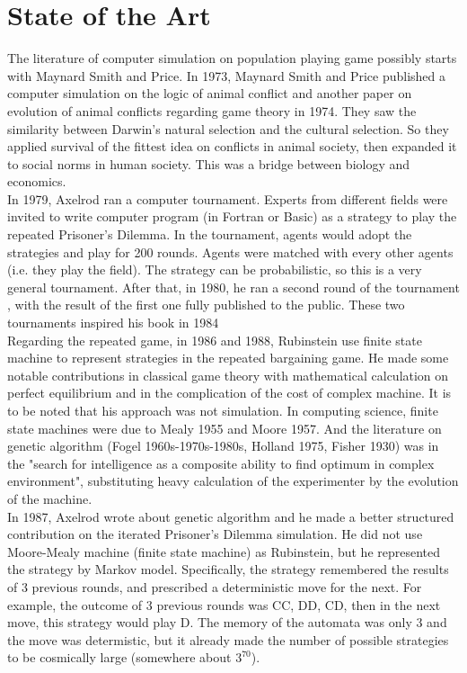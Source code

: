 \documentclass[12.5pt]{report}
\begin{document}
\chapter{State of the Art}

The literature of computer simulation on population playing game possibly starts with Maynard Smith and Price. In 1973, Maynard Smith and Price published a computer simulation on the logic of animal conflict \cite{maynard2} and another paper on evolution of animal conflicts regarding game theory in 1974. They saw the similarity between Darwin's natural selection and the cultural selection. So they applied survival of the fittest idea on conflicts in animal society, then expanded it to social norms in human society. This was a bridge between biology and economics.\\

In 1979, Axelrod \cite{axel1} ran a computer tournament. Experts from different fields were invited to write computer program (in Fortran or Basic) as a strategy to play the repeated Prisoner's Dilemma. In the tournament, agents would adopt the strategies and play for 200 rounds. Agents were matched with every other agents (i.e. they play the field). The strategy can be probabilistic, so this is a very general tournament. After that, in 1980, he ran a second round of the tournament \cite{axel2}, with the result of the first one fully published to the public. These two tournaments inspired his book in 1984 \cite{axel3}\\

Regarding the repeated game, in 1986 and 1988, Rubinstein use finite state machine to represent strategies in the repeated bargaining game. He made some notable contributions in classical game theory with mathematical calculation on perfect equilibrium and in the complication of the cost of complex machine. It is to be noted that his approach was not simulation. In computing science, finite state machines were due to Mealy 1955 and Moore 1957. And the literature on genetic algorithm (Fogel 1960s-1970s-1980s, Holland 1975, Fisher 1930) was in the "search for intelligence as a composite ability to find optimum in complex environment", substituting heavy calculation of the experimenter by the evolution of the machine.\\

In 1987, Axelrod wrote about genetic algorithm \cite{axel4} and he made a better structured contribution on the iterated Prisoner's Dilemma simulation. He did not use Moore-Mealy machine (finite state machine) as Rubinstein, but he represented the strategy by Markov model. Specifically, the strategy remembered the results of 3 previous rounds, and prescribed a deterministic move for the next. For example, the outcome of 3 previous rounds was CC, DD, CD, then in the next move, this strategy would play D. The memory of the automata was only 3 and the move was determistic, but it already made the number of possible strategies to be cosmically large (somewhere about $3^{70}$).\\
\end{document}
